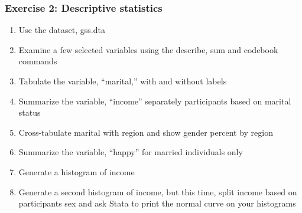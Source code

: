 \documentclass[table]{beamer}
\begin{document}
\begin{frame}
\frametitle{Exercise 2: Descriptive statistics}
\label{sec-3-4}

\begin{enumerate}
\item Use the dataset, gss.dta
\item Examine a few selected variables using the describe, sum and codebook commands
\item Tabulate the variable, ``marital,'' with and without labels
\item Summarize the variable, ``income'' separately participants based on marital status
\item Cross-tabulate marital with region and show gender percent by region
\item Summarize the variable, ``happy'' for married individuals only
\item Generate a histogram of income
\item Generate a second histogram of income, but this time, split income based on participants sex and ask Stata to print the normal curve on your histograms
\end{enumerate}
\end{frame}
\end{document}
